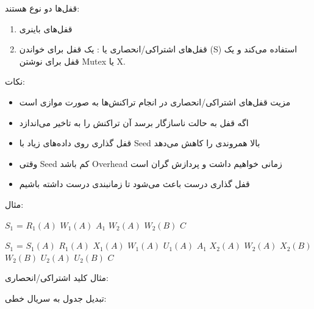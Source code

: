 \documentclass[a4paper]{article}
\begin{document}
قفل‌ها دو نوع هستند:

\begin{enumerate}
    \item قفل‌های باینری
    \item قفل‌های اشتراکی/انحصاری یا : یک قفل برای
    خواندن (S) استفاده می‌کند و یک قفل برای نوشتن Mutex یا X.
\end{enumerate}

نکات: 

\begin{itemize}
    \item مزیت قفل‌های اشتراکی/انحصاری در انجام تراکنش‌ها به صورت موازی است
    \item اگه قفل به حالت ناسازگار برسد آن تراکنش را به تاخیر می‌اندازد
    \item قفل گذاری روی داده‌های زیاد با Seed بالا همروندی را کاهش می‌دهد
    \item وقتی Seed کم باشد Overhead زمانی خواهیم داشت و پردازش گران است
    \item قفل گذاری درست باعث می‌شود تا زمانبندی درست داشته باشیم
\end{itemize}

مثال:

\begin{LTR}
    \centering
    $S_{1}$ = $R_{1}(A)$ $W_{1}(A)$ $A_{1}$ $W_{2}(A)$ $W_{2}(B)$ $C$

    $S_{1}$ = $S_{1}(A)$ $R_{1}(A)$ $X_{1}(A)$ $W_{1}(A)$ $U_{1}(A)$ $A_{1}$ $X_{2}(A)$ $W_{2}(A)$ $X_{2}(B)$ $W_{2}(B)$ $U_{2}(A)$ $U_{2}(B)$ $C$
\end{LTR}

مثال کلید اشتراکی/انحصاری:

\begin{LTR}
    \begin{table}[h]
        \centering
    \end{table}
\end{LTR}

تبدیل جدول به سریال خطی:
\end{document}

